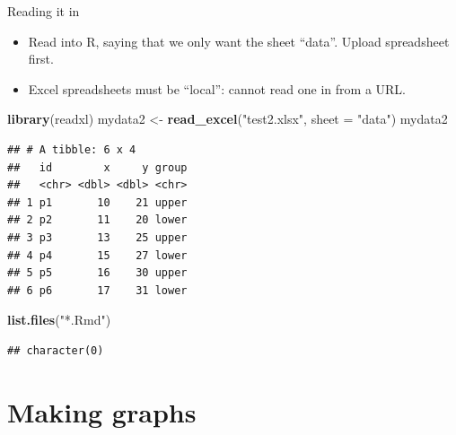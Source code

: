 \documentclass[ignorenonframetext,]{beamer}
\newenvironment{Shaded}{\begin{snugshade}}{\end{snugshade}}
\newcommand{\DataTypeTok}[1]{\textcolor[rgb]{0.13,0.29,0.53}{#1}}
\newcommand{\KeywordTok}[1]{\textcolor[rgb]{0.13,0.29,0.53}{\textbf{#1}}}
\newcommand{\NormalTok}[1]{#1}
\newcommand{\StringTok}[1]{\textcolor[rgb]{0.31,0.60,0.02}{#1}}
\providecommand{\tightlist}{%
  \setlength{\itemsep}{0pt}\setlength{\parskip}{0pt}}
\begin{document}
\begin{frame}[fragile]{Reading it in}
\protect\hypertarget{reading-it-in}{}

\begin{itemize}
\tightlist
\item
  Read into R, saying that we only want the sheet ``data''. Upload
  spreadsheet first.
\item
  Excel spreadsheets must be ``local'': cannot read one in from a URL.
\end{itemize}

\begin{Shaded}
\begin{Highlighting}[]
\KeywordTok{library}\NormalTok{(readxl)}
\NormalTok{mydata2 <-}\StringTok{ }\KeywordTok{read_excel}\NormalTok{(}\StringTok{"test2.xlsx"}\NormalTok{, }\DataTypeTok{sheet =} \StringTok{"data"}\NormalTok{)}
\NormalTok{mydata2}
\end{Highlighting}
\end{Shaded}

\begin{verbatim}
## # A tibble: 6 x 4
##   id        x     y group
##   <chr> <dbl> <dbl> <chr>
## 1 p1       10    21 upper
## 2 p2       11    20 lower
## 3 p3       13    25 upper
## 4 p4       15    27 lower
## 5 p5       16    30 upper
## 6 p6       17    31 lower
\end{verbatim}

\begin{Shaded}
\begin{Highlighting}[]
\KeywordTok{list.files}\NormalTok{(}\StringTok{"*.Rmd"}\NormalTok{)}
\end{Highlighting}
\end{Shaded}

\begin{verbatim}
## character(0)
\end{verbatim}

\end{frame}

\hypertarget{making-graphs}{%
\section{Making graphs}\label{making-graphs}}
\end{document}
